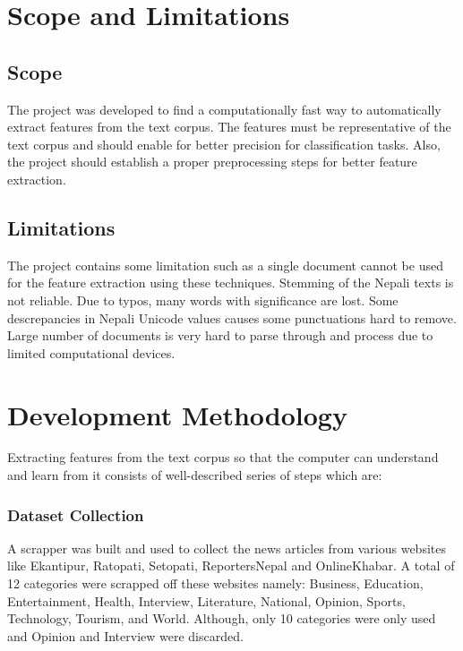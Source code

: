 \documentclass[12pt]{report}
\begin{document}
    \section{Scope and Limitations}

        \subsection{Scope}
        The project was developed to find a computationally fast way to automatically extract features from the text corpus.
        The features must be representative of the text corpus and should enable for better precision for classification tasks.
        Also, the project should establish a proper preprocessing steps for better feature extraction.

        \subsection{Limitations}
        The project contains some limitation such as a single document cannot be used for the feature extraction using these techniques.
        Stemming of the Nepali texts is not reliable. Due to typos, many words with significance are lost. Some descrepancies in Nepali Unicode values
        causes some punctuations hard to remove. Large number of documents is very hard to parse through and process due to limited computational devices.


    \section{Development Methodology}

        Extracting features from the text corpus so that the computer can understand and learn from it consists of well-described
        series of steps which are:



        \subsubsection{Dataset Collection}
            A scrapper was built and used to collect the news articles from various websites like Ekantipur, Ratopati, Setopati, ReportersNepal and OnlineKhabar.
            A total of 12 categories were scrapped off these websites namely: Business, Education, Entertainment, Health, Interview,
            Literature, National, Opinion, Sports, Technology, Tourism, and World. Although, only 10 categories were only used and Opinion and Interview were discarded.
\end{document}
